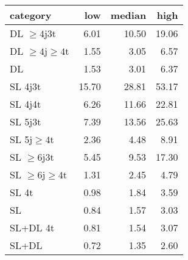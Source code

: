 \begin{tabular}{lrrr}
\hline
 category            &   low &   median &   high \\
\hline
 DL $\geq4$j$3$t     &  6.01 &    10.50 &  19.06 \\
 DL $\geq4$j$\geq4$t &  1.55 &     3.05 &   6.57 \\
 DL                  &  1.53 &     3.01 &   6.37 \\
 SL 4j3t             & 15.70 &    28.81 &  53.17 \\
 SL 4j4t             &  6.26 &    11.66 &  22.81 \\
 SL 5j$3$t           &  7.39 &    13.56 &  25.63 \\
 SL 5j$\geq4$t       &  2.36 &     4.48 &   8.91 \\
 SL $\geq6$j$3$t     &  5.45 &     9.53 &  17.30 \\
 SL $\geq6$j$\geq4$t &  1.31 &     2.45 &   4.79 \\
 SL 4t               &  0.98 &     1.84 &   3.59 \\
 SL                  &  0.84 &     1.57 &   3.03 \\
 SL+DL 4t            &  0.81 &     1.54 &   3.07 \\
 SL+DL               &  0.72 &     1.35 &   2.60 \\
\hline
\end{tabular}